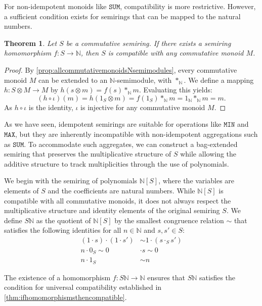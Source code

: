\documentclass[oneside, 11pt]{amsbook}
\theoremstyle{plain}
\newtheorem{thm}{Theorem}[section]
\theoremstyle{definition}
\theoremstyle{remark}
\begin{document}
For non-idempotent monoids like $\texttt{SUM}$, compatibility is more restrictive. However, a sufficient condition exists for semirings that can be mapped to the natural numbers.

\begin{thm}
    \label{thm:ifhomomorphismsthencompatible}
    Let $S$ be a commutative semiring. If there exists a semiring homomorphism $f : S \to \mathbb{N}$, then $S$ is compatible with any commutative monoid $M$.
\end{thm}
\begin{proof}
    By \autoref{prop:allcommutativemonoidsNsemimodules}, every commutative monoid $M$ can be extended to an $\mathbb{N}$-semimodule, with $\ast_{\mathbb{N}}$. We define a mapping $h : S \otimes M \to M$ by $h(s \otimes m) = f(s) \ast_{\mathbb{N}} m$. Evaluating this yields:
    \[
        (h \circ \iota)(m) = h(1_S \otimes m) = f(1_S) \ast_{\mathbb{N}} m = 1_{\mathbb{N}} \ast_{\mathbb{N}} m = m.
    \]
    As $h \circ \iota$ is the identity, $\iota$ is injective for any commutative monoid $M$.
\end{proof}

As we have seen, idempotent semirings are suitable for operations like $\texttt{MIN}$ and $\texttt{MAX}$, but they are inherently incompatible with non-idempotent aggregations such as $\texttt{SUM}$. To accommodate such aggregates, we can construct a bag-extended semiring that preserves the multiplicative structure of $S$ while allowing the additive structure to track multiplicities through the use of polynomials.

We begin with the semiring of polynomials $\mathbb{N}[S]$, where the variables are elements of $S$ and the coefficients are natural numbers. While $\mathbb{N}[S]$ is compatible with all commutative monoids, it does not always respect the multiplicative structure and identity elements of the original semiring $S$. We define $S{\mathbb{N}}$ as the quotient of $\mathbb{N}[S]$ by the smallest congruence relation $\sim$ that satisfies the following identities for all $n \in \mathbb{N}$ and $s, s' \in S$:
\[
    \begin{aligned}
        (1 \cdot s) \cdot (1 \cdot s') & \sim 1 \cdot (s \cdot_S s') \\
        n \cdot 0_S \sim 0             & \cdot s         \sim 0      \\
        n \cdot 1_S                    & \sim n
    \end{aligned}
\]

The existence of a homomorphism $f : S{\mathbb{N}} \to \mathbb{N}$ ensures that $S{\mathbb{N}}$ satisfies the condition for universal compatibility established in \autoref{thm:ifhomomorphismsthencompatible}.
\end{document}
